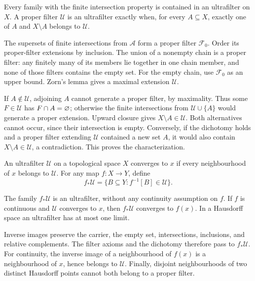 \begin{theorem}
\label{thm:ultrafilter_extension}
Every family with the finite intersection property is contained in an
ultrafilter on $X$. A proper filter $\mathcal U$ is an ultrafilter exactly
when, for every $A\subseteq X$, exactly one of $A$ and $X\setminus A$
belongs to $\mathcal U$.
\end{theorem}
\Proof
The supersets of finite intersections from $\mathcal A$ form a proper
filter $\mathcal F_0$. Order its proper-filter extensions by inclusion.
The union of a nonempty chain is a proper filter: any finitely many of
its members lie together in one chain member, and none of those filters
contains the empty set. For the empty chain, use $\mathcal F_0$ as an
upper bound. Zorn's lemma gives a maximal extension $\mathcal U$.

If $A\notin\mathcal U$, adjoining $A$ cannot generate a proper filter,
by maximality. Thus some $F\in\mathcal U$ has $F\cap A=\varnothing$;
otherwise the finite intersections from $\mathcal U\cup\{A\}$ would
generate a proper extension. Upward closure gives
$X\setminus A\in\mathcal U$. Both alternatives cannot occur, since
their intersection is empty. Conversely, if the dichotomy holds and a
proper filter extending $\mathcal U$ contained a new set $A$, it would
also contain $X\setminus A\in\mathcal U$, a contradiction. This proves
the characterization.
\Done

\begin{definition}
An ultrafilter $\mathcal U$ on a topological space $X$ converges to $x$
if every neighbourhood of $x$ belongs to $\mathcal U$. For any map
$f:X\to Y$, define
\[
f_*\mathcal U=\{B\subseteq Y:f^{-1}[B]\in\mathcal U\}.
\]
\end{definition}

\begin{lemma}
The family $f_*\mathcal U$ is an ultrafilter, without any continuity
assumption on $f$. If $f$ is continuous and $\mathcal U$ converges to $x$,
then $f_*\mathcal U$ converges to $f(x)$. In a Hausdorff space an
ultrafilter has at most one limit.
\end{lemma}
\Proof
Inverse images preserve the carrier, the empty set, intersections,
inclusions, and relative complements. The filter axioms and the dichotomy
therefore pass to $f_*\mathcal U$. For continuity, the inverse image of
a neighbourhood of $f(x)$ is a neighbourhood of $x$, hence belongs to
$\mathcal U$. Finally, disjoint neighbourhoods of two distinct Hausdorff
points cannot both belong to a proper filter.
\Done

